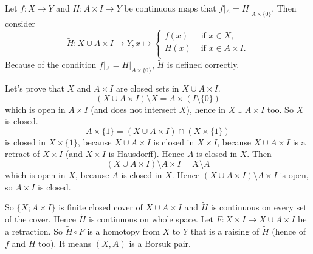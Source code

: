 \documentclass[12pt,a4paper]{article}
\begin{document}
    \begin{enumproblem}
        Let $f: X \to Y$ and $H: A \times I \to Y$ be continuous maps that $f|_A = H|_{A \times \{0\}}$. Then consider
        \[
            \widetilde{H}: X \cup A \times I \to Y, x \mapsto
            \begin{cases}
                f(x)& \text{ if } x \in X,\\
                H(x)& \text{ if } x \in A \times I.\\
            \end{cases}
        \]
        Because of the condition $f|_A = H|_{A \times \{0\}}$, $\widetilde{H}$ is defined correctly.

        Let's prove that $X$ and $A \times I$ are closed sets in $X \cup A \times I$.
        \[(X \cup A \times I) \setminus X = A \times (I \setminus \{0\})\]
        which is open in $A \times I$ (and does not intersect $X$), hence in $X \cup A \times I$ too. So $X$ is closed.
        \[A \times \{1\} = (X \cup A \times I) \cap (X \times \{1\})\]
        is closed in $X \times \{1\}$, because $X \cup A \times I$ is closed in $X \times I$, because $X \cup A \times I$ is a retract of $X \times I$ (and $X \times I$ is Hausdorff). Hence $A$ is closed in $X$. Then
        \[(X \cup A \times I) \setminus A \times I = X \setminus A\]
        which is open in $X$, because $A$ is closed in $X$. Hence $(X \cup A \times I) \setminus A \times I$ is open, so $A \times I$ is closed.

        So $\{X; A \times I\}$ is finite closed cover of $X \cup A \times I$ and $\widetilde{H}$ is continuous on every set of the cover. Hence $\widetilde{H}$ is continuous on whole space. Let $F: X \times I \to X \cup A \times I$ be a retraction. So $\widetilde{H} \circ F$ is a homotopy from $X$ to $Y$ that is a raising of $\widetilde{H}$ (hence of $f$ and $H$ too). It means $(X, A)$ is a Borsuk pair.
    \end{enumproblem}
\end{document}
